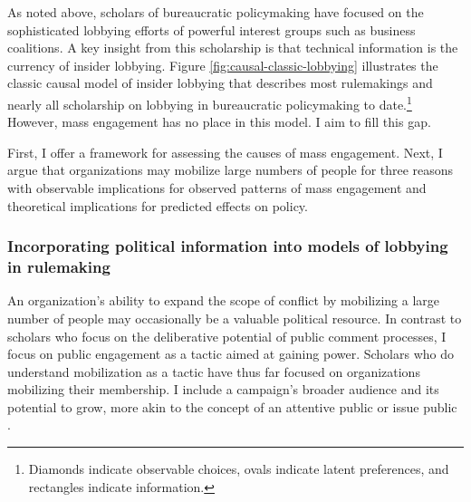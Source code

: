 As noted above, scholars of bureaucratic policymaking have focused on the sophisticated lobbying efforts of powerful interest groups such as business coalitions. A key insight from this scholarship is that technical information is the currency of insider lobbying. Figure \ref{fig:causal-classic-lobbying} illustrates the classic causal model of insider lobbying that describes most rulemakings and nearly all scholarship on lobbying in bureaucratic policymaking to date.\footnote{Diamonds indicate observable choices, ovals indicate latent preferences, and rectangles indicate information.} However, mass engagement has no place in this model. I aim to fill this gap.





First, I offer a framework for assessing the causes of mass engagement. %
Next, I argue that organizations may mobilize large numbers of people for three reasons with observable implications for observed patterns of mass engagement and theoretical implications for predicted effects on policy. 


\subsubsection{Incorporating political information into models of lobbying in rulemaking}

An organization's ability to expand the scope of conflict by mobilizing a large number of people may occasionally be a valuable political resource. 
In contrast to scholars who focus on the deliberative potential of public comment processes, I focus on public engagement as a tactic aimed at gaining power.%
Scholars who do understand mobilization as a tactic \citep{Furlong1997, Kerwin2011} have thus far focused on organizations mobilizing their membership. %
I include a campaign's broader audience and its potential to grow, more akin to the concept of an attentive public \citep{Key1961} or issue public \citep{Converse1964}.

